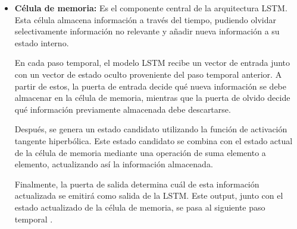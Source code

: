 \begin{itemize}
    \item \textbf{Célula de memoria:} Es el componente central de la arquitectura LSTM. Esta célula almacena información a través del tiempo, pudiendo olvidar selectivamente información no relevante y añadir nueva información a su estado interno.

    En cada paso temporal, el modelo LSTM recibe un vector de entrada junto con un vector de estado oculto proveniente del paso temporal anterior. A partir de estos, la puerta de entrada decide qué nueva información se debe almacenar en la célula de memoria, mientras que la puerta de olvido decide qué información previamente almacenada debe descartarse.
    
    Después, se genera un estado candidato utilizando la función de activación tangente hiperbólica. Este estado candidato se combina con el estado actual de la célula de memoria mediante una operación de suma elemento a elemento, actualizando así la información almacenada.
    
    Finalmente, la puerta de salida determina cuál de esta información actualizada se emitirá como salida de la LSTM. Este output, junto con el estado actualizado de la célula de memoria, se pasa al siguiente paso temporal \cite{redes-lstm-long-short-term-memory}.
    
\end{itemize}

